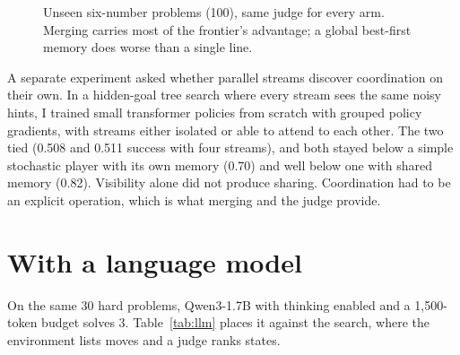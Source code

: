 \documentclass[10pt,twocolumn]{article}
\begin{document}
\begin{figure}[t]
\centering
{}
\caption{Unseen six-number problems (100), same judge for every arm. Merging carries most of the frontier's advantage; a global best-first memory does worse than a single line.}
\label{fig:ablation}
\end{figure}

A separate experiment asked whether parallel streams discover coordination on their own. In a hidden-goal tree search where every stream sees the same noisy hints, I trained small transformer policies from scratch with grouped policy gradients, with streams either isolated or able to attend to each other. The two tied (0.508 and 0.511 success with four streams), and both stayed below a simple stochastic player with its own memory (0.70) and well below one with shared memory (0.82). Visibility alone did not produce sharing. Coordination had to be an explicit operation, which is what merging and the judge provide.

\section{With a language model}
\label{sec:llm}

On the same 30 hard problems, Qwen3-1.7B with thinking enabled and a 1,500-token budget solves 3. Table~\ref{tab:llm} places it against the search, where the environment lists moves and a judge ranks states.
\end{document}

